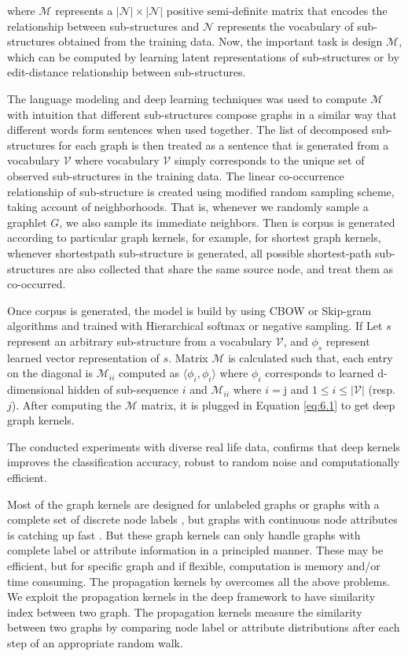 \documentclass[12pt,a4paper]{article}
\numberwithin{equation}{section}
\numberwithin{figure}{section}
\numberwithin{table}{section}
\begin{document}
where $\mathcal{M}$ represents a $|\mathcal{N}|\times |\mathcal{N}|$ positive semi-definite matrix that encodes the relationship between sub-structures and $\mathcal{N}$ represents the vocabulary of sub-structures obtained from the training data. Now, the important task is design $\mathcal{M}$, which can be computed by learning latent representations of sub-structures or by edit-distance relationship between sub-structures. 

The language modeling and deep learning techniques was used to compute $\mathcal{M}$ with intuition that different
sub-structures compose graphs in a similar way that different words form sentences when used together. The list of decomposed sub-structures
for each graph is then treated as a sentence that is generated from a
vocabulary $\mathcal{V}$  where vocabulary $\mathcal{V}$ simply corresponds to the unique set of observed sub-structures in the training data. The linear co-occurrence relationship of sub-structure is created using modified random sampling scheme, taking account of neighborhoods. That is, whenever we randomly sample a graphlet $G$, we also sample its immediate neighbors. Then is corpus is generated according to particular graph kernels, for example, for shortest graph kernels, whenever shortestpath sub-structure is generated, all possible shortest-path
sub-structures are also collected that share the same source node, and treat them
as co-occurred.

Once corpus is generated, the model is build by using CBOW or Skip-gram algorithms and trained with Hierarchical softmax or negative sampling. If Let $s$ represent an arbitrary sub-structure from a vocabulary $\mathcal{V}$, and $\phi_{s}$ represent learned vector representation of $s$. Matrix $\mathcal{M}$ is calculated such that, each entry on the diagonal is $\mathcal{M}_{ii}$ computed as $\big \langle \phi_{i},\phi_{i} \big \rangle$ where $\phi_{i}$ corresponds
to learned d-dimensional hidden of sub-sequence $i$ and $\mathcal{M}_{ii}$
where $i = $j and $1 \leq i \leq |\mathcal{V}|$ (resp. $j$). After computing the $\mathcal{M}$ matrix, it is plugged in Equation \ref{eq:6.1} to get deep graph kernels.

The conducted experiments with diverse real life data, confirms that deep kernels improves the classification accuracy, robust to random noise and computationally efficient.

Most of the graph kernels \citep{Vishwanathan2010} are designed for unlabeled graphs or graphs with a complete set of discrete node labels
, but graphs with continuous node attributes is catching up fast \citep{Feragen2013}. But these graph kernels can only handle graphs with complete label or attribute information in a principled manner. These may be efficient, but for specific graph and if flexible, computation is memory and/or time consuming. The propagation kernels by  \citet{Neumann2015} overcomes all the above problems. We exploit the propagation kernels in the deep framework to have similarity index between two graph. The propagation kernels measure the similarity between two graphs by comparing node label or attribute distributions after each step of an appropriate random walk.
\end{document}
